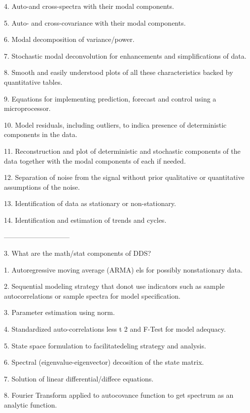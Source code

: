     4. Auto-and cross-spectra with their modal
       components.
 
    5. Auto- and cross-covariance with their
       modal components.
 
    6. Modal decomposition of variance/power.
 
    7. Stochastic modal deconvolution for
       enhancements and simplifications of data.
 
    8. Smooth and easily understood plots of all these
       characteristics backed by quantitative tables.
 
    9. Equations for implementing prediction, forecast
       and control using a microprocessor.
 
   10. Model residuals, including outliers, to indica
       presence of deterministic components in the data.
 
   11. Reconstruction and plot of deterministic and
       stochastic components of the data together with
       the modal components of each if needed.
 
   12. Separation of noise from the signal without prior
       qualitative or quantitative assumptions of the
       noise.
 
   13. Identification of data as stationary or
       non-stationary.
 
   14. Identification and estimation of
       trends and cycles.
 
-----------------------------
 
3. What are the math/stat components of DDS?
 
    1. Autoregressive moving average (ARMA) els for possibly
       nonstationary  data.
 
    2. Sequential modeling strategy that  donot  use
       indicators such as sample autocorrelations or sample spectra
       for model specification.
 
    3. Parameter estimation using   norm.
 
    4. Standardized auto-correlations less t 2 and F-Test for model
       adequacy.
 
    5. State space formulation to facilitatedeling strategy and
       analysis.
 
    6. Spectral (eigenvalue-eigenvector) decosition of the state
       matrix.
 
    7. Solution of linear differential/diffece equations.
 
    8. Fourier Transform applied to autocovance function to get
       spectrum as an analytic function.
 
